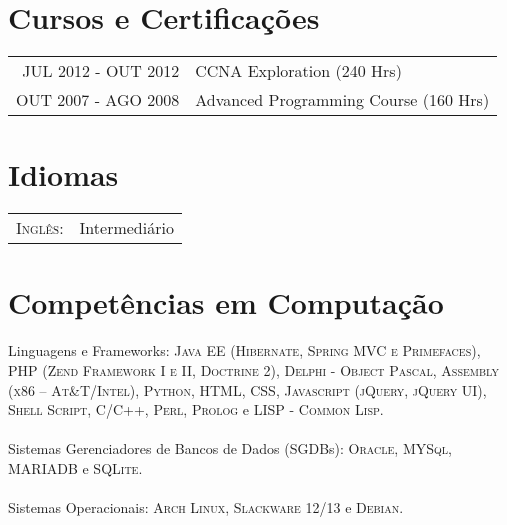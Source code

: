 \documentclass[a4paper,10pt]{article} %
\begin{document}

\section{Cursos e Certificações}

\begin{tabular}{rl}
  \textsc{JUL} 2012 - \textsc{OUT} 2012 & CCNA Exploration \footnotesize(240 Hrs)\normalsize\\
  \textsc{OUT} 2007 - \textsc{AGO} 2008 & Advanced Programming Course \footnotesize(160 Hrs)\normalsize\\

\end{tabular}


\section{Idiomas}

\begin{tabular}{rl}
\textsc{Inglês:} & Intermediário\\
\end{tabular}


\section{Competências em Computação}

  Linguagens e Frameworks:  \textsc{Java EE (Hibernate, Spring MVC e Primefaces)}, \textsc{PHP (Zend Framework I e II, Doctrine 2)}, \textsc{Delphi - Object Pascal}, \textsc{Assembly (x86 -- At\&T/Intel)}, \textsc{Python}, \textsc{HTML}, \textsc{CSS}, \textsc{Javascript (jQuery, jQuery UI)}, \textsc{Shell Script}, \textsc{C/C++}, \textsc{Perl}, \textsc{Prolog} e \textsc{LISP - Common Lisp}. 
\\
\\
  Sistemas Gerenciadores de Bancos de Dados (SGDBs):  \textsc{Oracle}, \textsc{MYSql}, \textsc{MARIADB} e \textsc{SQLite}. 
\\
\\
  Sistemas Operacionais: \textsc{Arch Linux}, \textsc{Slackware 12/13} e \textsc{Debian}.
\end{document}
